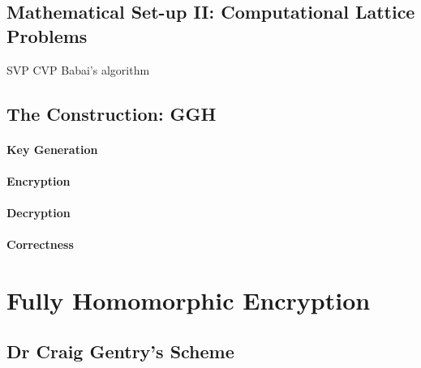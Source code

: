 \documentclass{article}
\theoremstyle{definition}
\begin{document}
\subsection{Mathematical Set-up II: Computational Lattice Problems}
SVP
CVP
Babai's algorithm
\subsection{The Construction: GGH}
\paragraph{Key Generation}
\paragraph{Encryption}
\paragraph{Decryption}
\paragraph{Correctness}
\section{Fully Homomorphic Encryption}
\subsection{Dr Craig Gentry's Scheme}

\printbibliography
\end{document}
